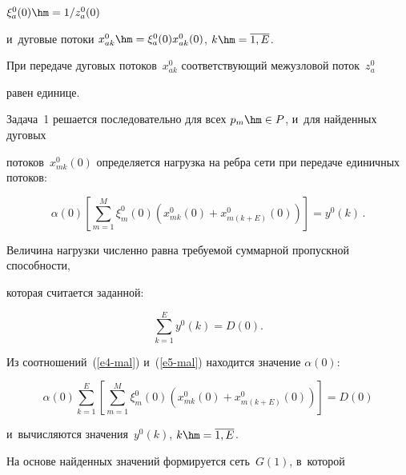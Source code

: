 $ \xi_a^0(0) \hm=  1/z_a^0(0)$


и~дуговые потоки $x_{ak}^0 \hm= \xi_a^0(0) x_{ak}^0(0)$, $k \hm= \overline{1, E}$.


При передаче дуговых потоков~$x_{ak}^0$ соответствующий межузловой поток~$z_a^0$ 


равен единице.





Задача~1 решается последовательно для всех $p_m \hm\in P$, и~для найденных дуговых 


потоков~$x_{mk}^0(0)$ определяется нагрузка на реб\-ра сети при передаче единичных потоков:


\begin{equation}


 \alpha(0) \left[ \sum\limits_{m=1}^{M} \xi_m^0(0) \left(x_{mk}^0(0)+ x_{m(k+E)}^0(0)\right) 


\right]  =  y^0(k)\,. 


\label{e4-mal}


\end{equation}


Величина нагрузки численно равна тре\-бу\-емой суммарной про\-пуск\-ной спо\-соб\-ности, 


которая считается заданной:


\begin{equation}


\sum\limits_{k=1}^{E} y^0(k) = D(0). \label{e5-mal}


\end{equation}





Из соотношений~(\ref{e4-mal}) и~(\ref{e5-mal}) находится значение $\alpha(0)$:


$$ 


\alpha(0) \sum\limits_{k=1}^{E} \left[ \sum\limits_{m=1}^{M} \xi_m^0(0) \left(x_{mk}^0(0)+ 


x_{m(k+E)}^0(0)\right) \right]  = D(0) 


$$


и~вычисляются значения~$y^0(k)$, $k\hm= \overline{1, E}$.





\pagebreak





На основе найденных значений формируется сеть~$G(1)$, в~которой 


